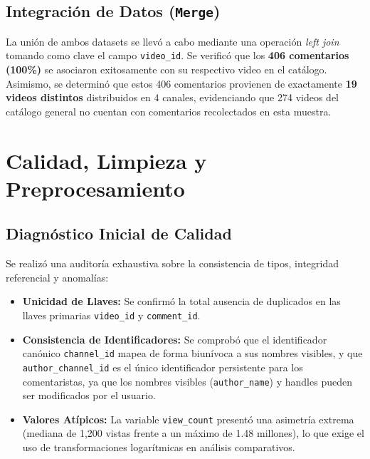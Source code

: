 \documentclass[11pt,a4paper]{article}
\begin{document}
\subsection{Integración de Datos (\texttt{Merge})}
La unión de ambos datasets se llevó a cabo mediante una operación \textit{left join} tomando como clave el campo \texttt{video\_id}. Se verificó que los \textbf{406 comentarios (100\%)} se asociaron exitosamente con su respectivo video en el catálogo. Asimismo, se determinó que estos 406 comentarios provienen de exactamente \textbf{19 videos distintos} distribuidos en 4 canales, evidenciando que 274 videos del catálogo general no cuentan con comentarios recolectados en esta muestra.

\section{Calidad, Limpieza y Preprocesamiento}

\subsection{Diagnóstico Inicial de Calidad}
Se realizó una auditoría exhaustiva sobre la consistencia de tipos, integridad referencial y anomalías:
\begin{itemize}
    \item \textbf{Unicidad de Llaves:} Se confirmó la total ausencia de duplicados en las llaves primarias \texttt{video\_id} y \texttt{comment\_id}.
    \item \textbf{Consistencia de Identificadores:} Se comprobó que el identificador canónico \texttt{channel\_id} mapea de forma biunívoca a sus nombres visibles, y que \texttt{author\_channel\_id} es el único identificador persistente para los comentaristas, ya que los nombres visibles (\texttt{author\_name}) y handles pueden ser modificados por el usuario.
    \item \textbf{Valores Atípicos:} La variable \texttt{view\_count} presentó una asimetría extrema (mediana de 1,200 vistas frente a un máximo de 1.48 millones), lo que exige el uso de transformaciones logarítmicas en análisis comparativos.
\end{itemize}
\end{document}

